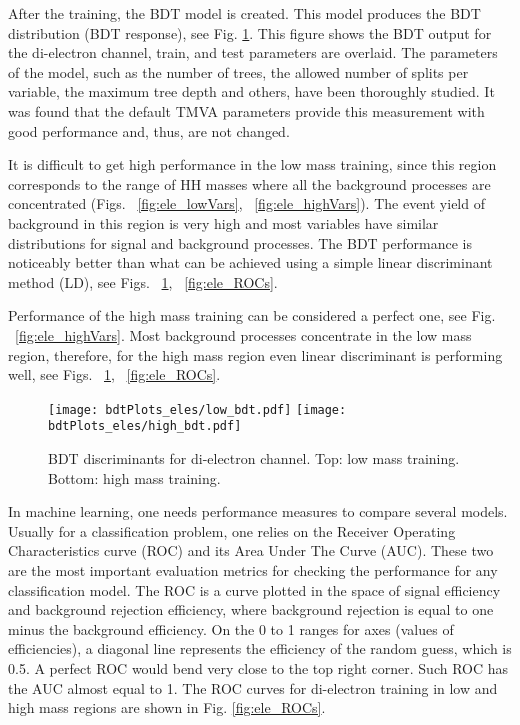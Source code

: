 \begin{small}
After the training, the BDT model is created. This model produces the BDT distribution (BDT response), see Fig. \ref{fig:ele_BDTs}. This figure shows the BDT output for the di-electron channel, train, and test parameters are overlaid. The parameters of the model, such as the number of trees, the allowed number of splits per variable, the maximum tree depth and others, have been thoroughly studied. It was found that the default TMVA parameters provide this measurement with good performance and, thus, are not changed.

It is difficult to get high performance in the low mass training, since
this region corresponds to the range of HH masses where all the background processes are concentrated (Figs. ~\ref{fig:ele_lowVars}, ~\ref{fig:ele_highVars}). The event yield of background in this region is very high and most variables have similar distributions for signal and background processes. The BDT performance is noticeably better than what can be achieved using a simple linear discriminant method (LD), see Figs. ~\ref{fig:ele_BDTs}, ~\ref{fig:ele_ROCs}.

Performance of the high mass training can be considered a perfect one, see Fig. ~\ref{fig:ele_highVars}. Most background processes concentrate in the low mass region, therefore, for the high mass region even linear
discriminant is performing well, see Figs. ~\ref{fig:ele_BDTs}, ~\ref{fig:ele_ROCs}.

\begin{figure}[H]
  \begin{center}
   \texttt{[image: bdtPlots\_eles/low\_bdt.pdf]}
   \texttt{[image: bdtPlots\_eles/high\_bdt.pdf]}
    \caption[BDT discriminants for di-electron channel.]{ BDT discriminants for di-electron channel. Top: low mass training. Bottom: high mass training. }
    \label{fig:ele_BDTs}
  \end{center}
\end{figure}

In machine learning, one needs performance measures to compare several models. Usually for a classification problem, one relies on the Receiver Operating Characteristics curve (ROC) and its Area Under The Curve (AUC). These two are the most important evaluation metrics for checking the performance for any classification model. The ROC is a curve plotted in the space of signal efficiency and background rejection efficiency, where background rejection is equal to one minus the background efficiency. On the 0 to 1 ranges for axes (values of efficiencies), a diagonal line represents the efficiency of the random guess, which is 0.5. A perfect ROC would bend very close to the top right corner. Such ROC has the AUC almost equal to 1. The ROC curves for di-electron training in low and high mass regions are shown in Fig. \ref{fig:ele_ROCs}. 
                      

\end{small}
